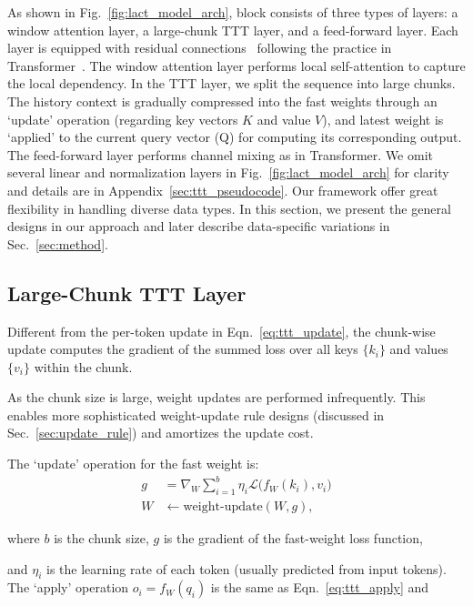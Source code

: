 \documentclass{article}
\begin{document}
As shown in Fig.~\ref{fig:lact_model_arch},
\methodname{} block consists of three types of layers: a window attention layer, a large-chunk TTT layer, and a feed-forward layer.
Each layer is equipped with residual connections~\cite{he2015deep} following the practice in Transformer~\cite{vaswani2017attention}.
The window attention layer performs local self-attention 
to capture the local dependency.
In the TTT layer, we split the sequence into large chunks.
The history context is gradually compressed into the fast weights through an `update' operation (regarding key vectors $K$ and value $V$), and latest weight is `applied' to the current query vector (Q) for computing its corresponding output.
The feed-forward layer performs channel mixing as in Transformer.
We omit several linear and normalization layers in Fig.~\ref{fig:lact_model_arch} for clarity and details are in Appendix~\ref{sec:ttt_pseudocode}.
Our framework offer great flexibility in handling diverse data types. 
In this section, we 
present the general designs in our approach and later  describe data-specific variations 
in Sec.~\ref{sec:method}.

\subsection{Large-Chunk TTT Layer}
\label{sec:ttt_layer}
Different from the per-token update in Eqn.~\ref{eq:ttt_update}, the chunk-wise update computes the gradient of the summed loss over all keys $\{k_i\}$ and values $\{v_i\}$ within the chunk.

As the chunk size is large, weight updates are performed infrequently. This enables more sophisticated weight-update rule designs (discussed in Sec.~\ref{sec:update_rule}) and amortizes the update cost.

The `update' operation for the fast weight is:
\begin{align}

g &=  \nabla_{W}  \sum_{i=1} ^b \eta_i \mathcal{L}  \big(f_W(k_i), v_i\big) \label{eq:ttt_chunk_gradient} \\
W &\leftarrow \mathrm{weight\mbox{-}update} (W, g),
\label{eq:ttt_chunk_update}
\end{align}

where $b$ is the chunk size, $g$ is the gradient of the fast-weight loss function, 

and $\eta_i$ is the learning rate of each token (usually predicted from input tokens).
The `apply' operation $o_i = f_W(q_i)$ is the same as Eqn.~\ref{eq:ttt_apply} and 
\end{document}
